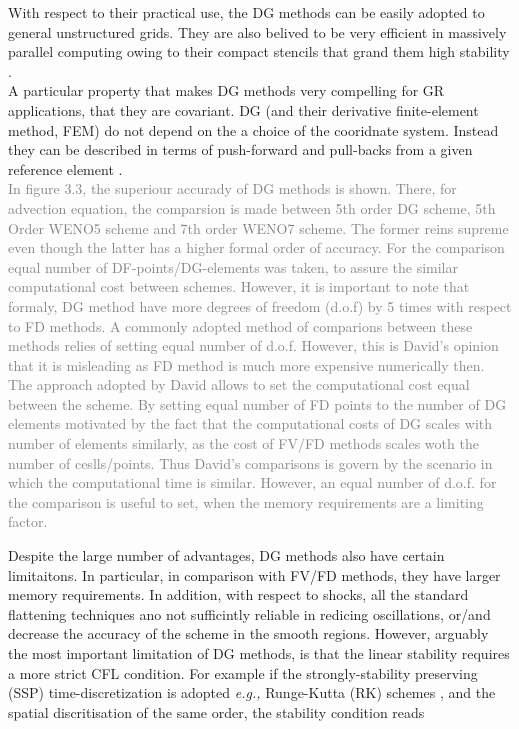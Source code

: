 With respect to their practical use, the DG methods can be easily adopted to general unstructured grids. They are also belived to be very efficient in massively parallel computing owing to their compact stencils that grand them high stability \cite{Biswas:1994}. \\

A particular property that makes DG methods very compelling for GR applications, that they are covariant. DG (and their derivative finite-element method, FEM) do not depend on the a choice of the cooridnate system. Instead they can be described in terms of push-forward and pull-backs from a given reference element \cite{Meier:1999}. \\

\textcolor{gray}{In figure 3.3, the superiour accurady of DG methods is shown. There, for advection equation, the comparsion is made between 5th order DG scheme, 5th Order WENO5 scheme and 7th order WENO7 scheme. The former reins supreme even though the latter has a higher formal order of accuracy. For the comparison equal number of DF-points/DG-elements was taken, to assure the similar computational cost between schemes. However, it is important to note that formaly, DG method have more degrees of freedom (d.o.f) by 5 times with respect to FD methods. A commonly adopted method of comparions between these methods relies of setting equal number of d.o.f. However, this is David's opinion that it is misleading as FD method is much more expensive numerically then. The approach adopted by David allows to set the computational cost equal between the scheme. By setting equal number of FD points to the number of DG elements motivated by the fact that the computational costs of DG scales with number of elements similarly, as the cost of FV/FD methods scales woth the number of ceslls/points. Thus David's comparisons is govern by the scenario in which the computational time is similar. However, an equal number of d.o.f. for the comparison is useful to set, when the memory requirements are a limiting factor.}

Despite the large number of advantages, DG methods also have certain limitaitons. In particular, in comparison with FV/FD methods, they have larger memory requirements. In addition, with respect to shocks, all the standard flattening techniques ano not sufficintly reliable in redicing oscillations, or/and decrease the accuracy of the scheme in the smooth regions. However, arguably the most important limitation of DG methods, is that the linear stability requires a more strict CFL condition. For example if the strongly-stability preserving (SSP) time-discretization is adopted \textit{e.g.,} Runge-Kutta (RK) schemes \cite{Gottlieb:2009}, and the spatial discritisation of the same order, the stability condition reads


